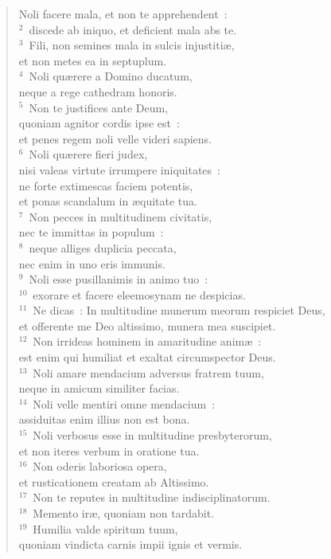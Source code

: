 \begin{flushleft}\begin{verse}\vspace{-19pt}Noli facere mala, et non te apprehendent~:\\
${}^{2}$~discede ab iniquo, et deficient mala abs te.\\
${}^{3}$~Fili, non semines mala in sulcis injustiti\ae ,\\ et non metes ea in septuplum.\\
${}^{4}$~Noli qu\ae rere a Domino ducatum,\\ neque a rege cathedram honoris.\\
${}^{5}$~Non te justifices ante Deum,\\ quoniam agnitor cordis ipse est~:\\ et penes regem noli velle videri sapiens.\\
${}^{6}$~Noli qu\ae rere fieri judex,\\ nisi valeas virtute irrumpere iniquitates~:\\ ne forte extimescas faciem potentis,\\ et ponas scandalum in \ae quitate tua.\\
${}^{7}$~Non pecces in multitudinem civitatis,\\ nec te immittas in populum~:\\
${}^{8}$~neque alliges duplicia peccata,\\ nec enim in uno eris immunis.\\
${}^{9}$~Noli esse pusillanimis in animo tuo~:\\
${}^{10}$~exorare et facere eleemosynam ne despicias.\\
${}^{11}$~Ne dicas~: In multitudine munerum meorum respiciet Deus,\\ et offerente me Deo altissimo, munera mea suscipiet.\\
${}^{12}$~Non irrideas hominem in amaritudine anim\ae~:\\ est enim qui humiliat et exaltat circumspector Deus.\\
${}^{13}$~Noli amare mendacium adversus fratrem tuum,\\ neque in amicum similiter facias.\\
${}^{14}$~Noli velle mentiri omne mendacium~:\\ assiduitas enim illius non est bona.\\
${}^{15}$~Noli verbosus esse in multitudine presbyterorum,\\ et non iteres verbum in oratione tua.\\
${}^{16}$~Non oderis laboriosa opera,\\ et rusticationem creatam ab Altissimo.\\
${}^{17}$~Non te reputes in multitudine indisciplinatorum.\\
${}^{18}$~Memento ir\ae , quoniam non tardabit.\\
${}^{19}$~Humilia valde spiritum tuum,\\ quoniam vindicta carnis impii ignis et vermis.\end{verse}\end{flushleft}


